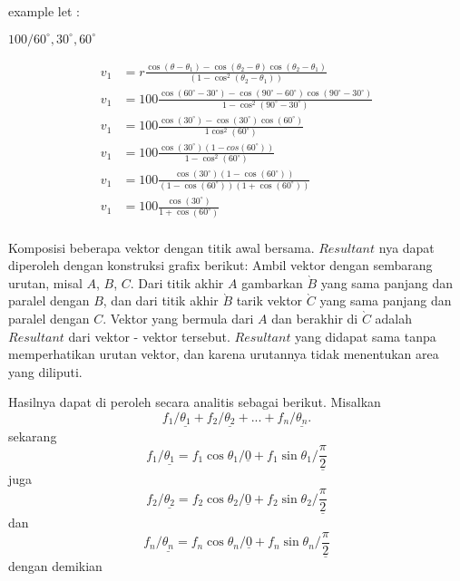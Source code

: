 \documentclass{article}
\begin{document}
example let :

$100/60^\circ, 30^\circ, 60^\circ$


\begin{align*}
v_1 &= r\frac{\cos(\theta - \theta_1) - \cos(\theta_2 - \theta)\cos(\theta_2 - \theta_1) }{(1 - \cos^2(\theta_2 - \theta_1))}\\
v_1 &= 100\frac{\cos(60^\circ-30^\circ) - \cos(90^\circ - 60^\circ)\cos(90^\circ - 30^\circ)}{1 - \cos^2(90^\circ - 30^\circ)}\\
v_1 &= 100\frac{\cos(30^\circ) - \cos(30^\circ)\cos(60^\circ)}{1 \cos^2(60^\circ)}\\
v_1 &= 100\frac{\cos(30^\circ)(1-cos(60^\circ))}{1-\cos^2(60^\circ)}\\
v_1 &= 100\frac{\cos(30^\circ)(1-\cos(60^\circ))}{(1-\cos(60^\circ))(1+\cos(60^\circ))}\\
v_1 &= 100\frac{\cos(30^\circ)}{1+\cos(60^\circ)}\\
\end{align*}

Komposisi beberapa vektor dengan titik awal bersama. $Resultant$ nya dapat 
diperoleh dengan konstruksi grafix berikut: Ambil vektor dengan sembarang 
urutan, misal $A$, $B$, $C$. Dari titik akhir $A$ gambarkan $\grave{B}$ yang 
sama panjang dan paralel dengan $B$, dan dari titik akhir $\grave{B}$ tarik 
vektor $\grave{C}$ yang sama panjang dan paralel dengan $C$. Vektor yang 
bermula dari $A$ dan berakhir di $\grave{C}$ adalah $Resultant$ dari 
vektor - vektor tersebut. $Resultant$ yang didapat sama tanpa memperhatikan 
urutan vektor, dan karena urutannya tidak menentukan area yang diliputi.

Hasilnya dapat di peroleh secara analitis sebagai berikut.
Misalkan 
\[
f_1/\underline{\theta_1} + f_2/\underline{\theta_2} +  ... + f_n/\underline{\theta_n}.
\]
sekarang
\[
f_1/\underline{\theta_1} = f_1\cos\theta_1/\underline{0} + f_1\sin\theta_1/\underline{\frac{\pi}{2}} 
\]
juga
\[
f_2/\underline{\theta_2} = f_2\cos\theta_2/\underline{0} + f_2\sin\theta_2/\underline{\frac{\pi}{2}} 
\]
dan
\[
f_n/\underline{\theta_n} = f_n\cos\theta_n/\underline{0} + f_n\sin\theta_n/\underline{\frac{\pi}{2}} 
\]
dengan demikian
\end{document}
